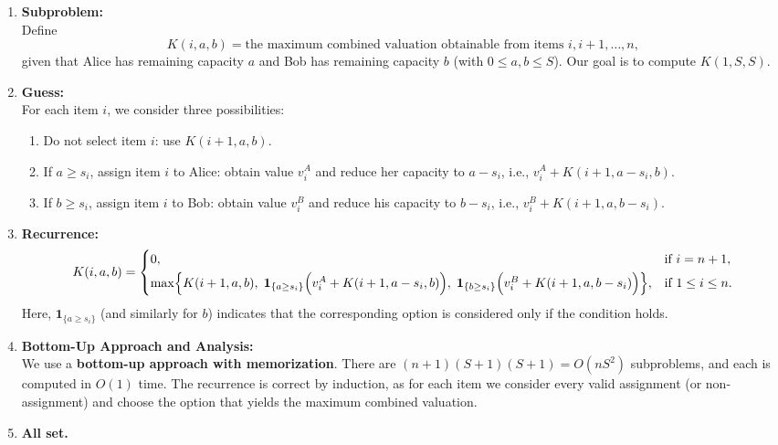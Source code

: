 \documentclass[11pt]{article}
\begin{document}
    \begin{enumerate}
        \item \textbf{Subproblem:}\\
        Define 
        \[
        K(i,a,b) = \text{the maximum combined valuation obtainable from items } i,i+1,\dots,n,
        \]
        given that Alice has remaining capacity \(a\) and Bob has remaining capacity \(b\) (with \(0\le a,b\le S\)). Our goal is to compute \(K(1,S,S)\).
    
        \item \textbf{Guess:}\\
        For each item \(i\), we consider three possibilities:
        \begin{enumerate}
            \item Do not select item \(i\): use \(K(i+1,a,b)\).
            \item If \(a\ge s_i\), assign item \(i\) to Alice: obtain value \(v_i^A\) and reduce her capacity to \(a-s_i\), i.e., \(v_i^A+K(i+1,a-s_i,b)\).
            \item If \(b\ge s_i\), assign item \(i\) to Bob: obtain value \(v_i^B\) and reduce his capacity to \(b-s_i\), i.e., \(v_i^B+K(i+1,a,b-s_i)\).
        \end{enumerate}
    
        \item \textbf{Recurrence:}\\[1mm]
        \[
        K(i,a,b)=
        \begin{cases}
        0, & \text{if } i=n+1,\\[1mm]
        \max \Bigl\{ K(i+1,a,b), \; 
        \mathbf{1}_{\{a\ge s_i\}}\Bigl(v_i^A+K(i+1,a-s_i,b)\Bigr), \; 
        \mathbf{1}_{\{b\ge s_i\}}\Bigl(v_i^B+K(i+1,a,b-s_i)\Bigr) \Bigr\}, & \text{if } 1\le i\le n.
        \end{cases}
        \]
        Here, \(\mathbf{1}_{\{a\ge s_i\}}\) (and similarly for \(b\)) indicates that the corresponding option is considered only if the condition holds.
    
        \item \textbf{Bottom-Up Approach and Analysis:}\\[1mm]
        We use a \textbf{bottom-up approach with memorization}. There are \((n+1)(S+1)(S+1)=O(nS^2)\) subproblems, and each is computed in \(O(1)\) time. The recurrence is correct by induction, as for each item we consider every valid assignment (or non-assignment) and choose the option that yields the maximum combined valuation.
    
        \item \textbf{All set.}
    \end{enumerate}
    
\end{document}
